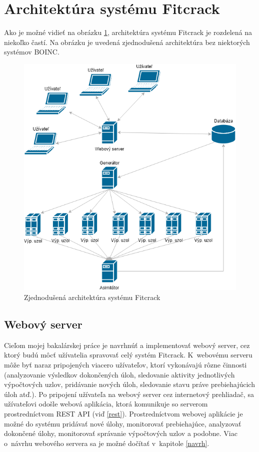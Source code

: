 \documentclass[slovak]{fitthesis}
\begin{document}
\section{Architektúra systému Fitcrack}
Ako je možné vidieť na obrázku \ref{fig:archFitcrack}, architektúra systému Fitcrack je rozdelená na niekoľko častí. Na obrázku je uvedená zjednodušená architektúra bez niektorých systémov BOINC.

\begin{figure}[H]
    \centering
    \includegraphics[scale=0.65]{obrazky/FitcrackSystem.png}
    \caption{Zjednodušená architektúra systému Fitcrack}
    \label{fig:archFitcrack}
\end{figure}


\subsection{Webový server}
Cieľom mojej bakalárskej práce je navrhnúť a implementovať webový server, cez ktorý budú môcť užívatelia spravovať celý systém Fitcrack. K~webovému serveru môže byť naraz pripojených viacero užívateľov, ktorí vykonávajú rôzne činnosti (analyzovanie výsledkov dokončených úloh, sledovanie aktivity jednotlivých výpočtových uzlov, pridávanie nových úloh, sledovanie stavu práve prebiehajúcich úloh atď.). Po pripojení užívateľa na webový server cez internetový prehliadač, sa užívateľovi odošle webová aplikácia, ktorá komunikuje so serverom prostredníctvom REST API (viď \ref{rest}). Prostredníctvom webovej aplikácie je možné do systému pridávať nové úlohy, monitorovať prebiehajúce, analyzovať dokončené úlohy, monitorovať správanie výpočtových uzlov a podobne. Viac o~návrhu webového servera sa je možné dočítať v~kapitole \ref{navrh}.
\end{document}
